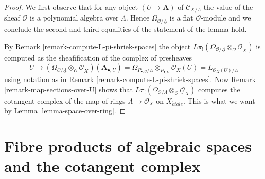 \documentclass{stacks-project}
\theoremstyle{plain}
\theoremstyle{definition}
\theoremstyle{remark}
\numberwithin{equation}{subsection}
\def\etale{{\acute{e}tale}}
\begin{document}
\begin{proof}
We first observe that for any object $(U \to \mathbf{A})$ of
$\mathcal{C}_{X/\Lambda}$
the value of the sheaf $\mathcal{O}$ is a polynomial algebra over $\Lambda$.
Hence $\Omega_{\mathcal{O}/\underline{\Lambda}}$ is a flat $\mathcal{O}$-module
and we conclude the second and third equalities of the statement of the
lemma hold.

\medskip\noindent
By Remark \ref{remark-compute-L-pi-shriek-spaces} the object
$L\pi_!(\Omega_{\mathcal{O}/\underline{\Lambda}}
\otimes_\mathcal{O} \underline{\mathcal{O}}_X)$
is computed as the sheafification of the complex of presheaves
$$
U \mapsto
\left(\Omega_{\mathcal{O}/\underline{\Lambda}}
\otimes_\mathcal{O} \underline{\mathcal{O}}_X\right)(\mathbf{A}_{\bullet, U})
=
\Omega_{P_{\bullet, U}/\Lambda} \otimes_{P_{\bullet, U}} \mathcal{O}_X(U) =
L_{\mathcal{O}_X(U)/\Lambda}
$$
using notation as in Remark \ref{remark-compute-L-pi-shriek-spaces}.
Now Remark \ref{remark-map-sections-over-U} shows that
$L\pi_!(\Omega_{\mathcal{O}/\underline{\Lambda}}
\otimes_\mathcal{O} \underline{\mathcal{O}}_X)$
computes the cotangent complex of the map of rings
$\underline{\Lambda} \to \mathcal{O}_X$ on $X_\etale$.
This is what we want by Lemma \ref{lemma-space-over-ring}.
\end{proof}






\section{Fibre products of algebraic spaces and the cotangent complex}
\label{section-fibre-product}
\end{document}
